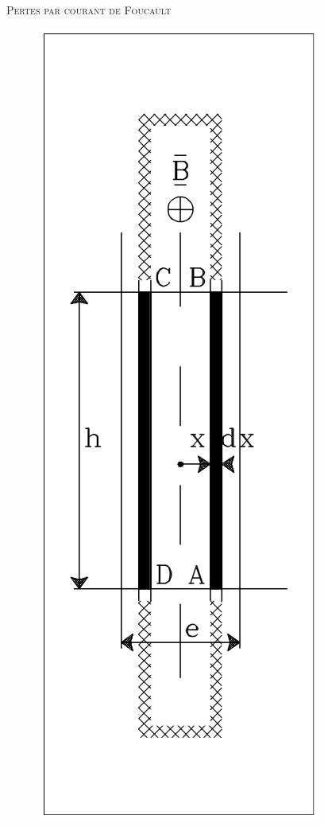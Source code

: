 	\textsc{Pertes par courant de Foucault}\\
	\begin{figure}
	\vspace{-5mm}
	\includegraphics[scale=0.4]{ch2/image7} 
	\label{fig:2.7}
	\end{figure}
